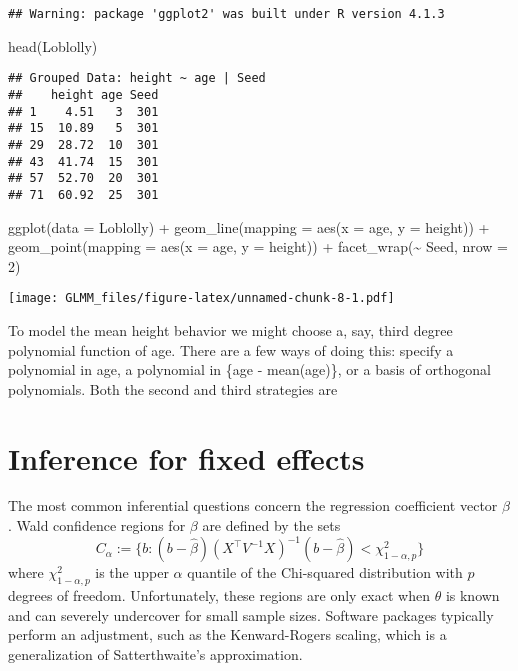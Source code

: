 \documentclass[
]{book}
\newenvironment{Shaded}{\begin{snugshade}}{\end{snugshade}}
\newcommand{\AttributeTok}[1]{\textcolor[rgb]{0.77,0.63,0.00}{#1}}
\newcommand{\DecValTok}[1]{\textcolor[rgb]{0.00,0.00,0.81}{#1}}
\newcommand{\FunctionTok}[1]{\textcolor[rgb]{0.00,0.00,0.00}{#1}}
\newcommand{\NormalTok}[1]{#1}
\newcommand{\SpecialCharTok}[1]{\textcolor[rgb]{0.00,0.00,0.00}{#1}}
\begin{document}
\begin{verbatim}
## Warning: package 'ggplot2' was built under R version 4.1.3
\end{verbatim}

\begin{Shaded}
\begin{Highlighting}[]
\FunctionTok{head}\NormalTok{(Loblolly)}
\end{Highlighting}
\end{Shaded}

\begin{verbatim}
## Grouped Data: height ~ age | Seed
##    height age Seed
## 1    4.51   3  301
## 15  10.89   5  301
## 29  28.72  10  301
## 43  41.74  15  301
## 57  52.70  20  301
## 71  60.92  25  301
\end{verbatim}

\begin{Shaded}
\begin{Highlighting}[]
\FunctionTok{ggplot}\NormalTok{(}\AttributeTok{data =}\NormalTok{ Loblolly) }\SpecialCharTok{+} 
  \FunctionTok{geom\_line}\NormalTok{(}\AttributeTok{mapping =} \FunctionTok{aes}\NormalTok{(}\AttributeTok{x =}\NormalTok{ age, }\AttributeTok{y =}\NormalTok{ height)) }\SpecialCharTok{+} 
  \FunctionTok{geom\_point}\NormalTok{(}\AttributeTok{mapping =} \FunctionTok{aes}\NormalTok{(}\AttributeTok{x =}\NormalTok{ age, }\AttributeTok{y =}\NormalTok{ height)) }\SpecialCharTok{+} 
  \FunctionTok{facet\_wrap}\NormalTok{(}\SpecialCharTok{\textasciitilde{}}\NormalTok{ Seed, }\AttributeTok{nrow =} \DecValTok{2}\NormalTok{)}
\end{Highlighting}
\end{Shaded}

\texttt{[image: GLMM\_files/figure-latex/unnamed-chunk-8-1.pdf]}

To model the mean height behavior we might choose a, say, third degree polynomial function of age. There are a few ways of doing this: specify a polynomial in age, a polynomial in \{age - mean(age)\}, or a basis of orthogonal polynomials. Both the second and third strategies are

\hypertarget{inference-for-fixed-effects}{%
\section{Inference for fixed effects}\label{inference-for-fixed-effects}}

The most common inferential questions concern the regression coefficient vector \(\beta\). Wald confidence regions for \(\beta\) are defined by the sets
\[C_\alpha := \{b: (b - \hat\beta)(X^\top V^{-1}X)^{-1}(b - \hat\beta)<\chi^2_{1-\alpha, p}\}\]
where \(\chi^2_{1-\alpha, p}\) is the upper \(\alpha\) quantile of the Chi-squared distribution with \(p\) degrees of freedom. Unfortunately, these regions are only exact when \(\theta\) is known and can severely undercover for small sample sizes. Software packages typically perform an adjustment, such as the Kenward-Rogers scaling, which is a generalization of Satterthwaite's approximation.
\end{document}
